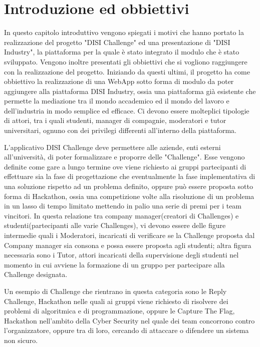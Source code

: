 \chapter{Introduzione ed obbiettivi }
\label{cha:intro}
In questo capitolo introduttivo vengono spiegati i motivi che hanno portato la realizzazione del progetto "DISI Challenge" ed una presentazione di "DISI Industry", la piattaforma per la quale è stato integrato il modulo che è stato sviluppato. Vengono inoltre presentati gli obbiettivi che si vogliono raggiungere con la realizzazione del progetto.
Iniziando da questi ultimi, il progetto ha come obbiettivo la realizzazione di una WebApp sotto forma di modulo da poter aggiungere alla piattaforma DISI Industry, ossia una piattaforma già esistente che permette la mediazione tra il mondo accademico ed il mondo del lavoro e dell'industria in modo semplice ed efficace. Ci devono essere molteplici tipologie di attori, tra i quali studenti, manager di compagnie, moderatori e tutor universitari, ognuno con dei privilegi differenti all'interno della piattaforma. 


L'applicativo DISI Challenge deve permettere alle aziende, enti esterni all'università, di poter formalizzare e proporre delle "Challenge". Esse vengono definite come gare a lungo termine ove viene richiesto ai gruppi partecipanti di effettuare sia la fase di progettazione che eventualmente la fase implementativa di una soluzione rispetto ad un problema definito, oppure può essere proposta sotto forma di Hackathon, ossia una competizione volte alla risoluzione di un problema in un lasso di tempo limitato mettendo in palio una serie di premi per i team vincitori. In questa relazione tra company manager(creatori di Challenges) e studenti(partecipanti alle varie Challenges), vi devono essere delle figure intermedie quali i Moderatori, incaricati di verificare se la Challenge proposta dal Company manager sia consona e possa essere proposta agli studenti; altra figura necessaria sono i Tutor, attori incaricati della supervisione degli studenti nel momento in cui avviene la formazione di un gruppo per partecipare alla Challenge designata.

Un esempio di Challenge che rientrano in questa categoria sono le Reply Challenge, Hackathon nelle quali ai gruppi viene richiesto di risolvere dei problemi di algoritmica e di programmazione, oppure le Capture The Flag, Hackathon nell'ambito della Cyber Security nel quale dei team concorrono contro l'organizzatore, oppure tra di loro, cercando di attaccare o difendere un sistema non sicuro.

